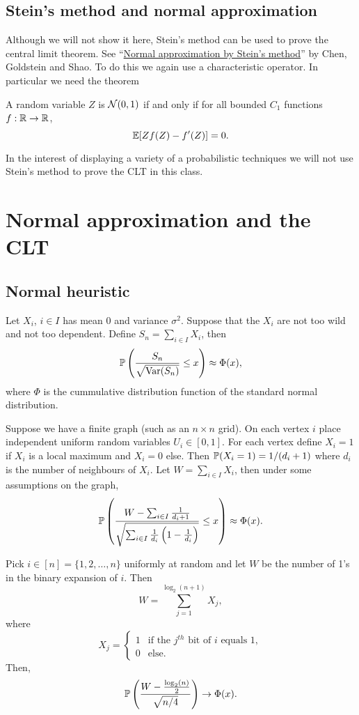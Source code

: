 \subsection{Stein's method and normal approximation}
Although we will not show it here, Stein's method can be used to prove the central limit theorem. See ``\href{https://searchworks.stanford.edu/view/9115286}{Normal approximation by Stein's method}'' by Chen, Goldstein and Shao. To do this we again use a characteristic operator. In particular we need the theorem
\begin{thrm}
    A random variable $Z$ is ${{\mathcal{N}}}(0,1)$ if and only if for all bounded $C_1$ functions $f: {\mathbb R} \to {\mathbb R}$, 
    \[{\mathbb{E}}[Zf(Z)-f'(Z)]=0. \]
\end{thrm}
In the interest of displaying a variety of a probabilistic techniques we will not use Stein's method to prove the CLT in this class.
\section{Normal approximation and the CLT}
\subsection{Normal heuristic}
Let $X_i$, $i \in I$ has mean 0 and variance $\sigma^2$. Suppose that the $X_i$ are not too wild and not too dependent. Define $S_n = \sum_{i \in I}X_i$, then 
\[{\mathbb{P}}\left(\frac{S_n}{\sqrt{\operatorname{Var}(S_n)}} \le x \right) \approx \Phi(x), \]
where $\Phi$ is the cummulative distribution function of the standard normal distribution.
\begin{ex}
    Suppose we have a finite graph (such as an $n\times n$ grid). On each vertex $i$ place independent uniform random variables $U_i \in [0,1]$. For each vertex define $X_i = 1$ if $X_i$ is a local maximum and $X_i=0$ else. Then ${\mathbb{P}}(X_i = 1)=1/(d_i+1)$ where $d_i$ is the number of neighbours of $X_i$. Let $W = \sum_{i \in I} X_i$, then under some assumptions on the graph,
    \[{\mathbb{P}} \left(\frac{W-\sum_{i \in I}\frac{1}{d_i+1}}{\sqrt{\sum_{i \in I}\frac{1}{d_i}\left(1-\frac{1}{d_i}\right)}}\le x\right)\approx \Phi(x). \]
\end{ex}
\begin{ex}
    Pick $i \in [n] = \{1,2,\ldots, n\}$ uniformly at random and let $W$ be the number of 1's in the binary expansion of $i$. Then 
    \[W = \sum_{j=1}^{\log_2(n+1)}X_j,\]
    where 
    \[X_j = \begin{cases}
        1 & \text{if the } j^{th} \text{ bit of } i \text{ equals 1},\\
        0 & \text{else.}  
    \end{cases}\]
    Then,
    \[{\mathbb{P}}\left(\frac{W-\frac{\log_2(n)}{2}}{\sqrt{n/4}}\right) \to \Phi(x). \]
\end{ex}

